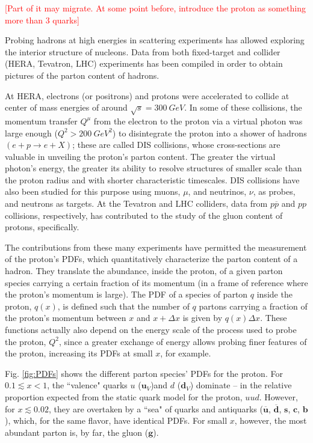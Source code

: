 \textcolor{red}{[Part of it may migrate. At some point before, introduce the proton as something more than 3 quarks]}

Probing hadrons at high energies in scattering experiments has allowed exploring the interior structure of nucleons. Data from  both fixed-target and collider (HERA, Tevatron, LHC) experiments has been compiled in order to obtain pictures of the parton content of hadrons.

At HERA, electrons (or positrons) and protons were accelerated to collide at center of mass energies of around $\sqrt{s} = \qty{300}{GeV}$. In some of these collisions, the momentum transfer $Q^\mu$ from the electron to the proton via a virtual photon was large enough ($Q^2 > \qty{200}{GeV^2}$) to disintegrate the proton into a shower of hadrons $(e  + p \to e + X)$; these are called \gls{DIS} collisions, whose cross-sections are valuable in unveiling the proton's parton content. The greater the virtual photon's energy, the greater its ability to resolve structures of smaller scale than the proton radius and with shorter characteristic timescales. \gls{DIS} collisions have also been studied for this purpose using muons, $\mu$, and neutrinos, $\nu$, as probes, and neutrons as targets. At the Tevatron and LHC colliders, data from $p\overline{p}$ and $pp$ collisions, respectively, has contributed to the study of the gluon content of protons, specifically. \cite{Thomson8:2013}\cite{PDG_2024}

The contributions from these many experiments have permitted the measurement of the proton's \glspl{PDF}, which quantitatively characterize the parton content of a hadron. They translate the abundance, inside the proton, of a given parton species carrying a certain fraction of its momentum (in a frame of reference where the proton's momentum is large). The \gls{PDF} of a species of parton $q$ inside the proton, $q(x)$, is defined such that the number of $q$ partons carrying a fraction of the proton's momentum between $x$ and $x + \Delta x$ is given by $q(x)\Delta x$. These functions actually also depend on the energy scale of the process used to probe the proton, $Q^2$, since a greater exchange of energy allows probing finer features of the proton, increasing its \glspl{PDF} at small $x$, for example. \cite{Thomson8:2013}

Fig. \ref{fig:PDFs} shows the different parton species' \glspl{PDF} for the proton. For $0.1 \lesssim x < 1$, the ``valence" quarks $u$ ($\mathbf{u}_V$)and $d$ ($\mathbf{d}_V$) dominate -- in the relative proportion expected from the static quark model for the proton, $uud$. However, for $x \lesssim 0.02$, they are overtaken by a ``sea" of quarks and antiquarks ($\overline{\mathbf{u}}$, $\overline{\mathbf{d}}$, $\mathbf{s}$, $\mathbf{c}$, $\mathbf{b}$), which, for the same flavor, have identical \glspl{PDF}. For small $x$, however, the most abundant parton is, by far, the gluon ($\mathbf{g}$).


